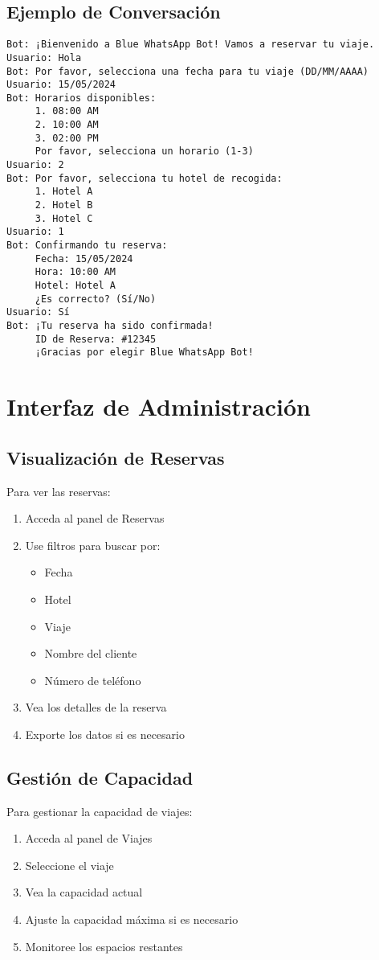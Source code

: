 \subsection{Ejemplo de Conversación}
\begin{verbatim}
Bot: ¡Bienvenido a Blue WhatsApp Bot! Vamos a reservar tu viaje.
Usuario: Hola
Bot: Por favor, selecciona una fecha para tu viaje (DD/MM/AAAA)
Usuario: 15/05/2024
Bot: Horarios disponibles:
     1. 08:00 AM
     2. 10:00 AM
     3. 02:00 PM
     Por favor, selecciona un horario (1-3)
Usuario: 2
Bot: Por favor, selecciona tu hotel de recogida:
     1. Hotel A
     2. Hotel B
     3. Hotel C
Usuario: 1
Bot: Confirmando tu reserva:
     Fecha: 15/05/2024
     Hora: 10:00 AM
     Hotel: Hotel A
     ¿Es correcto? (Sí/No)
Usuario: Sí
Bot: ¡Tu reserva ha sido confirmada!
     ID de Reserva: #12345
     ¡Gracias por elegir Blue WhatsApp Bot!
\end{verbatim}

\section{Interfaz de Administración}

\subsection{Visualización de Reservas}
Para ver las reservas:
\begin{enumerate}
    \item Acceda al panel de Reservas
    \item Use filtros para buscar por:
        \begin{itemize}
            \item Fecha
            \item Hotel
            \item Viaje
            \item Nombre del cliente
            \item Número de teléfono
        \end{itemize}
    \item Vea los detalles de la reserva
    \item Exporte los datos si es necesario
\end{enumerate}

\subsection{Gestión de Capacidad}
Para gestionar la capacidad de viajes:
\begin{enumerate}
    \item Acceda al panel de Viajes
    \item Seleccione el viaje
    \item Vea la capacidad actual
    \item Ajuste la capacidad máxima si es necesario
    \item Monitoree los espacios restantes
\end{enumerate}

